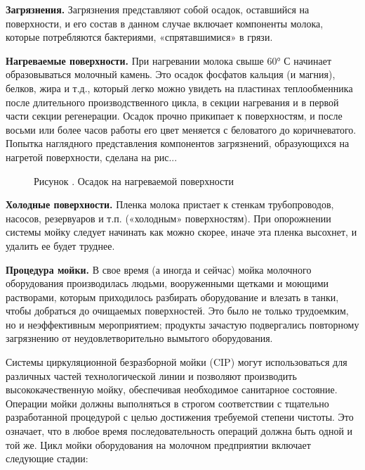 {\par \redline \textbf{Загрязнения.} Загрязнения представляют собой осадок, оставшийся на поверхности, и его состав в данном случае включает компоненты молока, которые потребляются бактериями, «спрятавшимися» в грязи.

\par \redline \textbf{Нагреваемые поверхности.} При нагревании молока свыше 60° С начинает образовываться молочный камень.
Это осадок фосфатов кальция (и магния), белков, жира и т.д., который легко можно увидеть на пластинах теплообменника после длительного производственного цикла, в секции нагревания и в первой части секции регенерации. Осадок прочно прикипает к поверхностям, и после восьми или более часов работы его цвет меняется с беловатого до коричневатого. Попытка наглядного представления компонентов загрязнений, образующихся на нагретой поверхности, сделана на рис.\thechaptercntr .\theimagecntr.

\begin{figure}[htb]
	\centering
	\def\svgwidth{\textwidth}
	
	\caption*{\gostFont Рисунок \thechaptercntr .\theimagecntr \spc {--} Осадок на нагреваемой поверхности}
	\label{fig:ris1}
\end{figure}

\addtocounter{imagecntr}{1}

\par \redline \textbf{Холодные поверхности.} Пленка молока пристает к стенкам трубопроводов, насосов, резервуаров и т.п. («холодным» поверхностям). При опорожнении системы мойку следует начинать как можно скорее, иначе эта пленка высохнет, и удалить ее будет труднее.


\par \redline \textbf{Процедура мойки.} В свое время (а иногда и сейчас) мойка молочного оборудования производилась людьми, вооруженными щетками и моющими растворами, которым приходилось разбирать оборудование и влезать в танки, чтобы добраться до очищаемых поверхностей. Это было не только трудоемким, но и неэффективным мероприятием; продукты зачастую подвергались повторному загрязнению от неудовлетворительно вымытого оборудования.

\par \redline Системы циркуляционной безразборной мойки (CIP) могут использоваться для различных частей технологической линии и позволяют производить высококачественную мойку, обеспечивая необходимое санитарное состояние. Операции мойки должны выполняться в строгом соответствии с тщательно разработанной процедурой с целью достижения требуемой степени чистоты. Это означает, что в любое время последовательность операций должна быть одной и той же. Цикл мойки оборудования на молочном предприятии включает следующие стадии:

}
